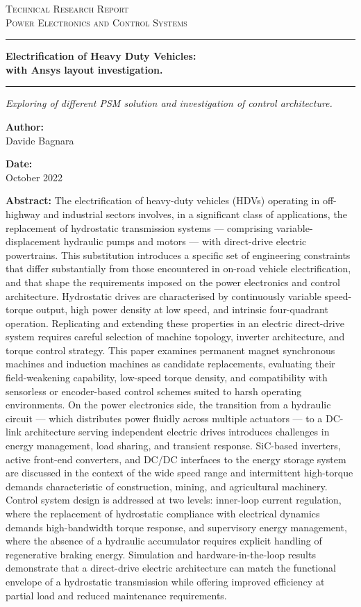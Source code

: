 \documentclass[12pt,a4paper,oneside]{book}
\newcommand{\DocCategory}{Technical Research Report}
\newcommand{\DocField}{Power Electronics and Control Systems}
\newcommand{\DocTitle}{%
	{\fontsize{20}{24}\selectfont\bfseries Electrification of Heavy Duty Vehicles:} \\[16pt]
	{\fontsize{16}{20}\selectfont\bfseries with Ansys layout investigation.}
}
\newcommand{\DocSubtitle}{%
	Exploring of different PSM solution and investigation of control architecture.
}
\newcommand{\DocAuthor}{Davide Bagnara}
\newcommand{\DocDate}{October 2022}
\newcommand{\DocAbstract}{%
	The electrification of heavy-duty vehicles (HDVs) operating in off-highway and industrial sectors involves, in a significant class of applications, the replacement of hydrostatic transmission systems — comprising variable-displacement hydraulic pumps and motors — with direct-drive electric powertrains. This substitution introduces a specific set of engineering constraints that differ substantially from those encountered in on-road vehicle electrification, and that shape the requirements imposed on the power electronics and control architecture.
	Hydrostatic drives are characterised by continuously variable speed-torque output, high power density at low speed, and intrinsic four-quadrant operation. Replicating and extending these properties in an electric direct-drive system requires careful selection of machine topology, inverter architecture, and torque control strategy. This paper examines permanent magnet synchronous machines and induction machines as candidate replacements, evaluating their field-weakening capability, low-speed torque density, and compatibility with sensorless or encoder-based control schemes suited to harsh operating environments.
	On the power electronics side, the transition from a hydraulic circuit — which distributes power fluidly across multiple actuators — to a DC-link architecture serving independent electric drives introduces challenges in energy management, load sharing, and transient response. SiC-based inverters, active front-end converters, and DC/DC interfaces to the energy storage system are discussed in the context of the wide speed range and intermittent high-torque demands characteristic of construction, mining, and agricultural machinery.
	Control system design is addressed at two levels: inner-loop current regulation, where the replacement of hydrostatic compliance with electrical dynamics demands high-bandwidth torque response, and supervisory energy management, where the absence of a hydraulic accumulator requires explicit handling of regenerative braking energy. Simulation and hardware-in-the-loop results demonstrate that a direct-drive electric architecture can match the functional envelope of a hydrostatic transmission while offering improved efficiency at partial load and reduced maintenance requirements.
}
\begin{document}
	\titlepage
	\begin{center}
		{\Large\scshape \DocCategory}\\[8pt]
		{\large\scshape \DocField}
	\end{center}
	
	\vspace{18pt}
	\noindent\rule{\linewidth}{0.8pt}
	
	\vspace{28pt}
	\begin{center}
		\DocTitle
	\end{center}
	
	\vspace{4pt}
	\noindent\rule{\linewidth}{2.2pt}
	
	\vspace{14pt}
	\begin{center}
		\begin{onehalfspace}
			{\large\itshape \DocSubtitle}
		\end{onehalfspace}
	\end{center}
	
	\vspace{18pt}
	
	\begin{minipage}{0.92\linewidth}
		\noindent
		\begin{minipage}[t]{0.48\linewidth}
			\textbf{Author:}\\[2pt]
			\DocAuthor
		\end{minipage}%
		\hfill
		\begin{minipage}[t]{0.48\linewidth}
			\raggedleft
			\textbf{Date:}\\[2pt]
			\DocDate
		\end{minipage}
	\end{minipage}
	\vspace{18pt}
	
	\begin{center}
		\begin{minipage}{0.85\linewidth}
			\footnotesize 
			\begin{onehalfspace}
				\textbf{Abstract:} \DocAbstract
			\end{onehalfspace}
		\end{minipage}
	\end{center}
	
\end{document}
